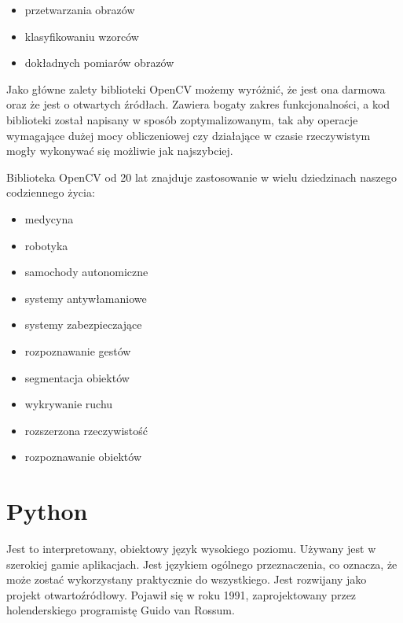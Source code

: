 \documentclass[a4paper,12pt,twoside,openany]{report}
\begin{document}
\begin{itemize}
	\item przetwarzania obrazów
	\item klasyfikowaniu wzorców
	\item dokładnych pomiarów obrazów
\end{itemize}

Jako główne zalety biblioteki OpenCV możemy wyróżnić, że jest ona darmowa oraz że jest o otwartych źródłach. Zawiera bogaty zakres funkcjonalności, a kod biblioteki został napisany w sposób zoptymalizowanym, tak aby operacje wymagające dużej mocy obliczeniowej czy działające w czasie rzeczywistym mogły wykonywać się możliwie jak najszybciej.

Biblioteka OpenCV od 20 lat znajduje zastosowanie w wielu dziedzinach naszego codziennego życia:
\begin{itemize} 
	\item medycyna
	\item robotyka
	\item samochody autonomiczne
	\item systemy antywłamaniowe 
	\item systemy zabezpieczające
	\item rozpoznawanie gestów
	\item segmentacja obiektów
	\item wykrywanie ruchu
	\item rozszerzona rzeczywistość
	\item rozpoznawanie obiektów
\end{itemize}

\section{Python}
Jest to interpretowany, obiektowy język wysokiego poziomu. Używany jest w szerokiej gamie  aplikacjach. Jest językiem ogólnego przeznaczenia, co oznacza, że może zostać wykorzystany praktycznie do wszystkiego. Jest rozwijany jako projekt otwartoźródłowy. Pojawił się w roku 1991, zaprojektowany przez holenderskiego programistę Guido van Rossum.
\end{document}
